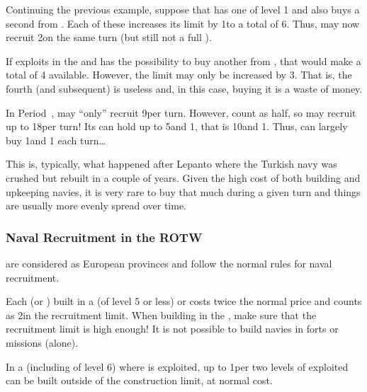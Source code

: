 \begin{exemple}[Wood]
  Continuing the previous example, suppose that \SUE has one  \MNU
  of level 1 and also buys a second  from \ANG. Each of these
   increases its limit by 1\ND to a total of 6\ND. Thus, \SUE may
  now recruit 2\FLEET\Facemoins on the same turn (but still not a full
  \FLEET\Faceplus).
  
  If \SUE exploits  in the \ROTW and has the possibility to buy
  another  from \POL, that would make a total of 4 
  available. However, the limit may only be increased by 3\ND. That is, the
  fourth (and subsequent)  is useless and, in this case, buying it
  is a waste of money.
\end{exemple}

\begin{exemple}[Galleys]
  In Period~, \TUR may ``only'' recruit 9\ND per turn. However,
  \NGD count as half, so \TUR may recruit up to 18\NGD per turn! Its
  \FLEET\Faceplus can hold up to 5\ND and 1\NTD, that is 10\NGD and
  1\NTD. Thus, \TUR can largely buy 1\FLEET\Faceplus and 1\FLEET\Facemoins
  each turn\ldots 

  This is, typically, what happened after Lepanto where the Turkish navy was
  crushed but rebuilt in a couple of years. Given the high cost of both
  building and upkeeping navies, it is very rare to buy that much \ND during a
  given turn and things are usually more evenly spread over time.
\end{exemple}

\subsubsection{Naval Recruitment in the ROTW}
 are considered as European provinces and follow the
normal rules for naval recruitment.

 Each \ND (or \NTD) built in a \COL (of level
5 or less) or \TP costs twice the normal price and counts as 2\ND in the
recruitment limit.
\bparag When building \FLEET\Facemoins in the \ROTW, make sure that the
recruitment limit is high enough!
\bparag It is not possible to build navies in forts or missions (alone).

\aparag[Fisheries]\label{chExpenses:Effect of Fish Purchase} In a \COL
(including of level 6) where  is exploited, up to 1\NDE per two
levels of  exploited can be built outside of the construction limit,
at normal cost.

